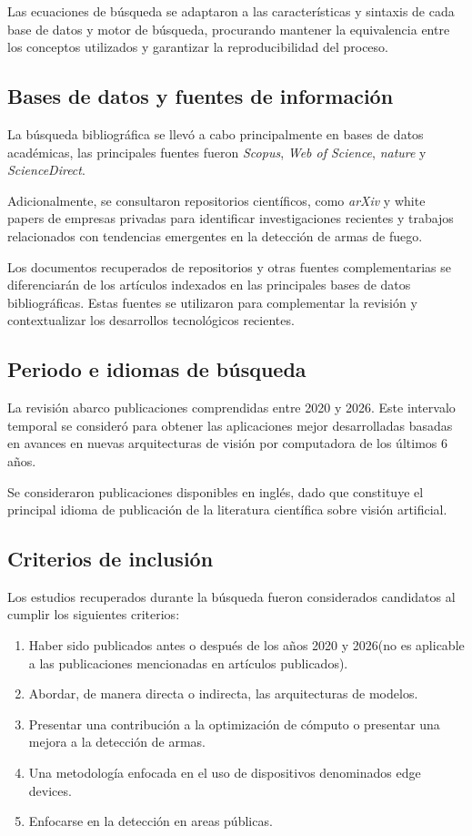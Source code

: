 \documentclass[stu,12pt,floatsintext]{apa7}
\begin{document}
Las ecuaciones de búsqueda se adaptaron a las características y sintaxis de cada base de datos y motor de búsqueda, procurando mantener la equivalencia entre los conceptos utilizados y garantizar la reproducibilidad del proceso.

\subsection{Bases de datos y fuentes de información}

La búsqueda bibliográfica se llevó a cabo principalmente en bases de datos académicas, las principales fuentes fueron \textit{Scopus}, \textit{Web of Science}, \textit{nature} y \textit{ScienceDirect}.

Adicionalmente, se consultaron repositorios científicos, como \textit{arXiv} y white papers de empresas privadas para identificar investigaciones recientes y trabajos relacionados con tendencias emergentes en la detección de armas de fuego.

Los documentos recuperados de repositorios y otras fuentes complementarias se diferenciarán de los artículos indexados en las principales bases de datos bibliográficas. Estas fuentes se utilizaron para complementar la revisión y contextualizar los desarrollos tecnológicos recientes.

\subsection{Periodo e idiomas de búsqueda}

La revisión abarco publicaciones comprendidas entre 2020 y 2026. Este intervalo temporal se consideró para obtener las aplicaciones mejor desarrolladas basadas en avances en nuevas arquitecturas de visión por computadora de los últimos 6 años.

Se consideraron publicaciones disponibles en inglés, dado que constituye el principal idioma de publicación de la literatura científica sobre visión artificial.

\subsection{Criterios de inclusión}

Los estudios recuperados durante la búsqueda fueron considerados candidatos al cumplir los siguientes criterios:

\begin{enumerate}
\item Haber sido publicados antes o después de los años 2020 y 2026(no es aplicable a las publicaciones mencionadas en artículos publicados).
\item Abordar, de manera directa o indirecta, las arquitecturas de modelos.
\item Presentar una contribución a la optimización de cómputo o presentar una mejora a la detección de armas.
\item Una metodología enfocada en el uso de dispositivos denominados edge devices.
\item Enfocarse en la detección en areas públicas.
\end{enumerate}
\end{document}
